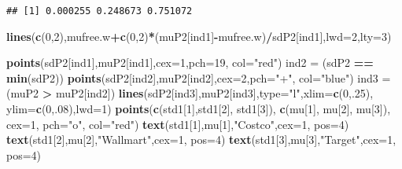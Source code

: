 \documentclass[]{article}
\newenvironment{Shaded}{\begin{snugshade}}{\end{snugshade}}
\newcommand{\DataTypeTok}[1]{\textcolor[rgb]{0.13,0.29,0.53}{#1}}
\newcommand{\DecValTok}[1]{\textcolor[rgb]{0.00,0.00,0.81}{#1}}
\newcommand{\KeywordTok}[1]{\textcolor[rgb]{0.13,0.29,0.53}{\textbf{#1}}}
\newcommand{\NormalTok}[1]{#1}
\newcommand{\OperatorTok}[1]{\textcolor[rgb]{0.81,0.36,0.00}{\textbf{#1}}}
\newcommand{\StringTok}[1]{\textcolor[rgb]{0.31,0.60,0.02}{#1}}
\begin{document}
\begin{verbatim}
## [1] 0.000255 0.248673 0.751072
\end{verbatim}

\begin{Shaded}
\begin{Highlighting}[]
\KeywordTok{lines}\NormalTok{(}\KeywordTok{c}\NormalTok{(}\DecValTok{0}\NormalTok{,}\DecValTok{2}\NormalTok{),mufree.w}\OperatorTok{+}\KeywordTok{c}\NormalTok{(}\DecValTok{0}\NormalTok{,}\DecValTok{2}\NormalTok{)}\OperatorTok{*}\NormalTok{(muP2[ind1]}\OperatorTok{-}\NormalTok{mufree.w)}\OperatorTok{/}\NormalTok{sdP2[ind1],}\DataTypeTok{lwd=}\DecValTok{2}\NormalTok{,}\DataTypeTok{lty=}\DecValTok{3}\NormalTok{)}

\KeywordTok{points}\NormalTok{(sdP2[ind1],muP2[ind1],}\DataTypeTok{cex=}\DecValTok{1}\NormalTok{,}\DataTypeTok{pch=}\DecValTok{19}\NormalTok{, }\DataTypeTok{col=}\StringTok{"red"}\NormalTok{) }
\NormalTok{ind2 =}\StringTok{ }\NormalTok{(sdP2 }\OperatorTok{==}\StringTok{ }\KeywordTok{min}\NormalTok{(sdP2)) }
\KeywordTok{points}\NormalTok{(sdP2[ind2],muP2[ind2],}\DataTypeTok{cex=}\DecValTok{2}\NormalTok{,}\DataTypeTok{pch=}\StringTok{"+"}\NormalTok{, }\DataTypeTok{col=}\StringTok{"blue"}\NormalTok{) }
\NormalTok{ind3 =}\StringTok{ }\NormalTok{(muP2 }\OperatorTok{>}\StringTok{ }\NormalTok{muP2[ind2])}
\KeywordTok{lines}\NormalTok{(sdP2[ind3],muP2[ind3],}\DataTypeTok{type=}\StringTok{"l"}\NormalTok{,}\DataTypeTok{xlim=}\KeywordTok{c}\NormalTok{(}\DecValTok{0}\NormalTok{,.}\DecValTok{25}\NormalTok{),}
      \DataTypeTok{ylim=}\KeywordTok{c}\NormalTok{(}\DecValTok{0}\NormalTok{,.}\DecValTok{08}\NormalTok{),}\DataTypeTok{lwd=}\DecValTok{1}\NormalTok{)  }
\KeywordTok{points}\NormalTok{(}\KeywordTok{c}\NormalTok{(std1[}\DecValTok{1}\NormalTok{],std1[}\DecValTok{2}\NormalTok{], std1[}\DecValTok{3}\NormalTok{]), }\KeywordTok{c}\NormalTok{(mu[}\DecValTok{1}\NormalTok{], mu[}\DecValTok{2}\NormalTok{], mu[}\DecValTok{3}\NormalTok{]), }\DataTypeTok{cex=}\DecValTok{1}\NormalTok{, }\DataTypeTok{pch=}\StringTok{"o"}\NormalTok{, }\DataTypeTok{col=}\StringTok{"red"}\NormalTok{) }
\KeywordTok{text}\NormalTok{(std1[}\DecValTok{1}\NormalTok{],mu[}\DecValTok{1}\NormalTok{],}\StringTok{"Costco"}\NormalTok{,}\DataTypeTok{cex=}\DecValTok{1}\NormalTok{, }\DataTypeTok{pos=}\DecValTok{4}\NormalTok{)}
\KeywordTok{text}\NormalTok{(std1[}\DecValTok{2}\NormalTok{],mu[}\DecValTok{2}\NormalTok{],}\StringTok{"Wallmart"}\NormalTok{,}\DataTypeTok{cex=}\DecValTok{1}\NormalTok{, }\DataTypeTok{pos=}\DecValTok{4}\NormalTok{)}
\KeywordTok{text}\NormalTok{(std1[}\DecValTok{3}\NormalTok{],mu[}\DecValTok{3}\NormalTok{],}\StringTok{"Target"}\NormalTok{,}\DataTypeTok{cex=}\DecValTok{1}\NormalTok{, }\DataTypeTok{pos=}\DecValTok{4}\NormalTok{)}
\end{Highlighting}
\end{Shaded}
\end{document}
